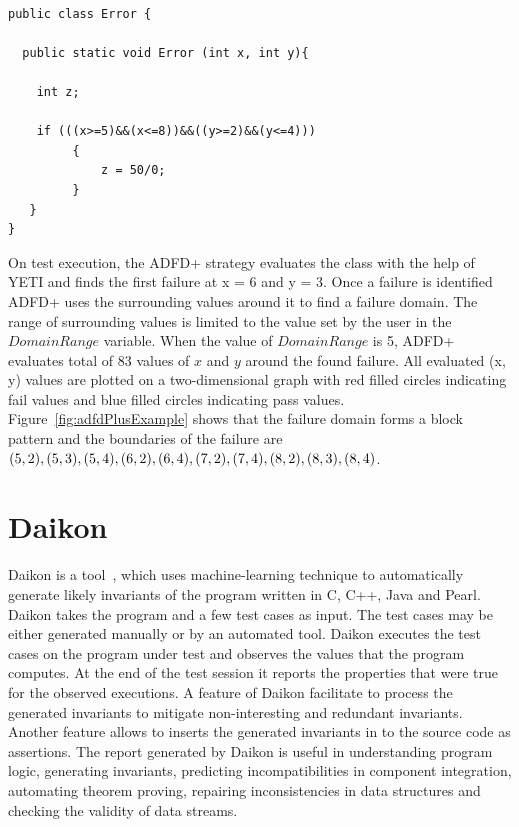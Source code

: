 \begin{lstlisting}

public class Error {

  public static void Error (int x, int y){

    int z;

    if (((x>=5)&&(x<=8))&&((y>=2)&&(y<=4)))
		 {
			 z = 50/0;
		 }
   } 
}
\end{lstlisting}

On test execution, the ADFD+ strategy evaluates the class with the help of YETI and finds the first failure at x = 6 and y = 3. Once a failure is identified ADFD+ uses the surrounding values around it to find a failure domain. The range of surrounding values is limited to the value set by the user in the $Domain Range$ variable. When the value of $Domain Range$ is 5, ADFD+ evaluates total of 83 values of $x$ and $y$ around the found failure. All evaluated (x, y) values are plotted on a two-dimensional graph with red filled circles indicating fail values and blue filled circles indicating pass values. Figure~\ref{fig:adfdPlusExample} shows that the failure domain forms a block pattern and the boundaries of the failure are $(5, 2), (5, 3),(5, 4), (6, 2), (6, 4), (7, 2), (7, 4),\\ (8, 2), (8, 3), (8, 4)$. 






\section{Daikon}\label{sec:intro6_6}
Daikon is a tool~\cite{ernst2007daikon}, which uses machine-learning technique to automatically generate likely invariants of the program written in C, C++, Java and Pearl. Daikon takes the program and a few test cases as input. The test cases may be either generated manually or by an automated tool. Daikon executes the test cases on the program under test and observes the values that the program computes. At the end of the test session it reports the properties that were true for the observed executions. A feature of Daikon facilitate to process the generated invariants to mitigate non-interesting and redundant invariants. Another feature allows to inserts the generated invariants in to the source code as assertions. The report generated by Daikon is useful in understanding program logic, generating invariants, predicting incompatibilities in component integration, automating theorem proving, repairing inconsistencies in data structures and checking the validity of data streams.




